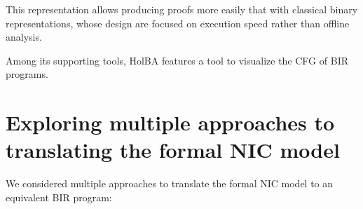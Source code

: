 \documentclass{kththesis}
\begin{document}
{This representation allows producing proofs more easily that with classical binary representations, whose design are focused on execution speed rather than offline analysis.


Among its supporting tools, HolBA features a tool to visualize the \gls{CFG} of BIR programs.

\section{Exploring multiple approaches to translating the formal NIC model}

We considered multiple approaches to translate the formal NIC model to an equivalent BIR program:

}
\end{document}
